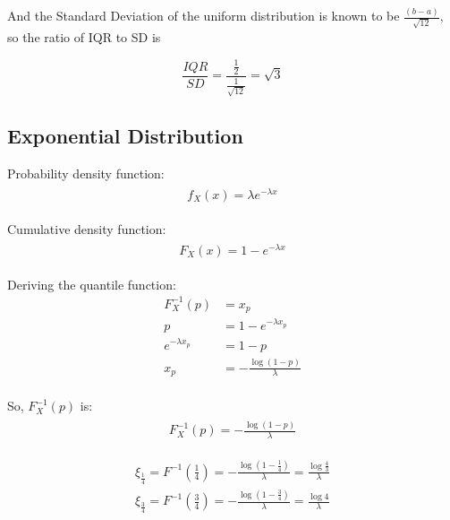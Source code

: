 \documentclass[paper=a4, fontsize=11pt]{scrartcl} %
\numberwithin{equation}{section} %
\numberwithin{figure}{section} %
\numberwithin{table}{section} %
\begin{document}
And the Standard Deviation of the uniform distribution is known to be $\frac{(b-a)}{\sqrt{12}}$, so the ratio of IQR to SD is

\begin{equation}
	\frac{IQR}{SD} = \frac{\frac{1}{2}}{\frac{1}{\sqrt{12}}} = \sqrt{3}
\end{equation}


\subsection{Exponential Distribution}

Probability density function:
\begin{align} 
\begin{split}
	f_X(x) = \lambda e^{-\lambda x}
\end{split}					
\end{align}

Cumulative density function:
\begin{align} 
\begin{split}
	F_X(x) = 1-e^{-\lambda x}
\end{split}					
\end{align}

Deriving the quantile function:
\begin{equation}
\begin{aligned} 
	F_X^{-1}(p) &= x_p  \\
	p &= 1-e^{-\lambda x_p} \\
	e^{-\lambda x_p} &= 1-p \\
	x_p &= -\frac{\log(1-p)}{\lambda} \\
\end{aligned}
\end{equation}

So, $F_X^{-1}(p)$ is: 
\begin{align} 
\begin{split}
	F_X^{-1}(p) = -\frac{\log(1-p)}{\lambda}
\end{split}					
\end{align}

\begin{equation}
\begin{aligned} 
	\xi_{\frac{1}{4}} = F^{-1}(\tfrac{1}{4}) = -\frac{\log(1-\frac{1}{4})}{\lambda} = \frac{\log{\frac{4}{3}}}{\lambda}\\
	\xi_{\frac{3}{4}} = F^{-1}(\tfrac{3}{4}) = -\frac{\log(1-\frac{3}{4})}{\lambda} = \frac{\log{4}}{\lambda}
\end{aligned}
\end{equation}
\end{document}
